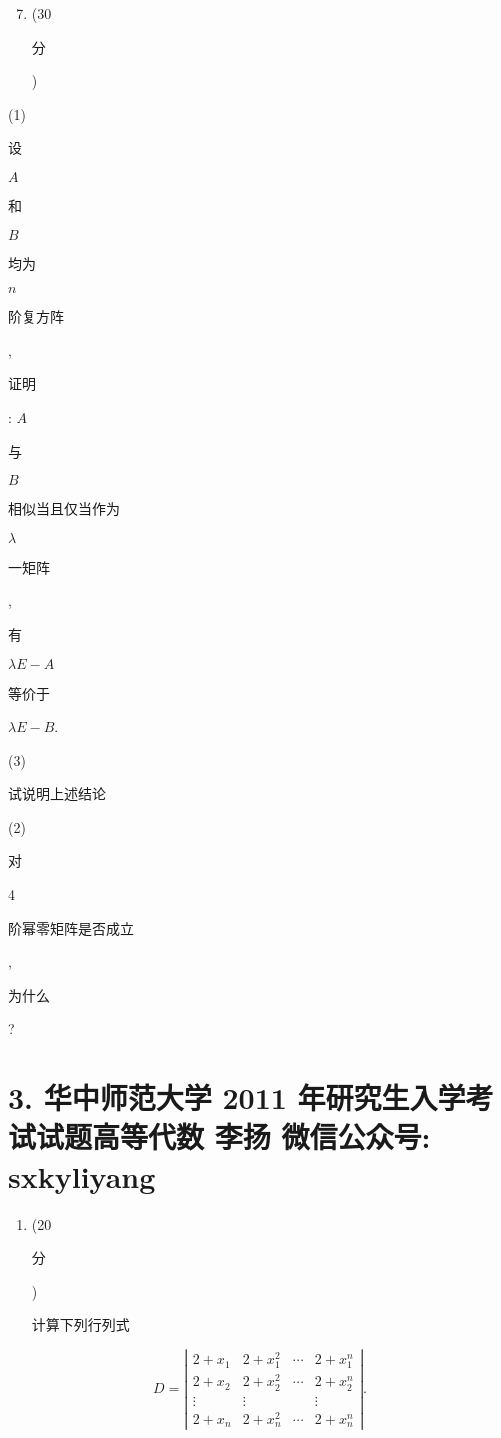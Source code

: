 \documentclass[10pt]{article}
\begin{document}
\begin{enumerate}
  \setcounter{enumi}{6}
  \item (30 \begin{CJK}{UTF8}{mj}分\end{CJK})
\end{enumerate}
(1) \begin{CJK}{UTF8}{mj}设\end{CJK} $A$ \begin{CJK}{UTF8}{mj}和\end{CJK} $B$ \begin{CJK}{UTF8}{mj}均为\end{CJK} $n$ \begin{CJK}{UTF8}{mj}阶复方阵\end{CJK}, \begin{CJK}{UTF8}{mj}证明\end{CJK}: $A$ \begin{CJK}{UTF8}{mj}与\end{CJK} $B$ \begin{CJK}{UTF8}{mj}相似当且仅当作为\end{CJK} $\lambda$ \begin{CJK}{UTF8}{mj}一矩阵\end{CJK}, \begin{CJK}{UTF8}{mj}有\end{CJK} $\lambda E-A$ \begin{CJK}{UTF8}{mj}等价于\end{CJK} $\lambda E-B$.

(3) \begin{CJK}{UTF8}{mj}试说明上述结论\end{CJK} (2) \begin{CJK}{UTF8}{mj}对\end{CJK} 4 \begin{CJK}{UTF8}{mj}阶幂零矩阵是否成立\end{CJK}, \begin{CJK}{UTF8}{mj}为什么\end{CJK}?

\section{3. 华中师范大学 2011 年研究生入学考试试题高等代数 
 李扬 
 微信公众号: sxkyliyang}
\begin{enumerate}
  \item (20 \begin{CJK}{UTF8}{mj}分\end{CJK}) \begin{CJK}{UTF8}{mj}计算下列行列式\end{CJK}
\end{enumerate}
$$
D=\left|\begin{array}{cccc}
2+x_{1} & 2+x_{1}^{2} & \cdots & 2+x_{1}^{n} \\
2+x_{2} & 2+x_{2}^{2} & \cdots & 2+x_{2}^{n} \\
\vdots & \vdots & & \vdots \\
2+x_{n} & 2+x_{n}^{2} & \cdots & 2+x_{n}^{n}
\end{array}\right| .
$$
\end{document}
